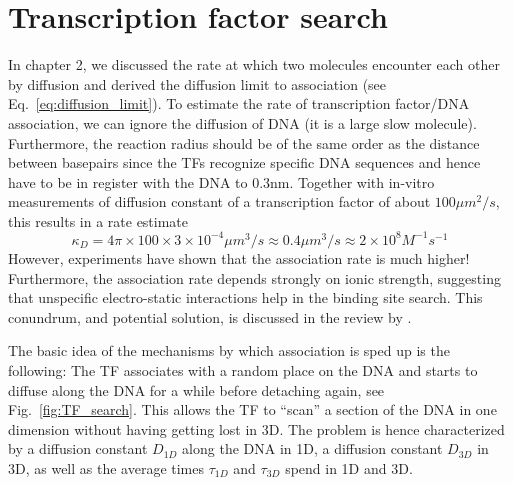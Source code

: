 \section{Transcription factor search}
In chapter 2, we discussed the rate at which two molecules encounter each other by diffusion and derived the diffusion limit to association (see Eq.~\ref{eq:diffusion_limit}).
To estimate the rate of transcription factor/DNA association, we can ignore the diffusion of DNA (it is a large slow molecule). Furthermore, the reaction radius should be of the same order as the distance between basepairs since the TFs recognize specific DNA sequences and hence have to be in register with the DNA to 0.3nm. Together with in-vitro measurements of diffusion constant of a transcription factor of about $100\mu m^2/s$, this results in a rate estimate
\begin{equation}
	\kappa_{D} = 4\pi \times 100 \times 3\times 10^{-4} \mu m^3/s \approx 0.4  \mu m^3/s \approx 2\times 10^8 M^{-1}s^{-1}
\end{equation}
However, experiments have shown that the association rate is much higher!
Furthermore, the association rate depends strongly on ionic strength, suggesting that unspecific electro-static interactions help in the binding site search.
This conundrum, and potential solution, is discussed in the review by \citet{hippel_facilitated_1989}.

The basic idea of the mechanisms by which association is sped up is the following:
The TF associates with a random place on the DNA and starts to diffuse along the DNA for a while before detaching again, see Fig.~\ref{fig:TF_search}.
This allows the TF to ``scan'' a section of the DNA in one dimension without having getting lost in 3D.
The problem is hence characterized by a diffusion constant $D_{1D}$ along the DNA in 1D, a diffusion constant $D_{3D}$ in 3D, as well as the average times $\tau_{1D}$ and $\tau_{3D}$ spend in 1D and 3D.


